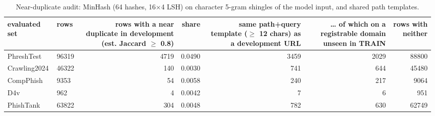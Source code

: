 \begin{table}[t]
\centering
\scriptsize
\caption{Near-duplicate audit: MinHash (64 hashes, 16×4 LSH) on character 5-gram shingles of the model input, and shared path templates.}
\label{tab:rev_R5_near_duplicates}
\begin{tabular}{llrrrrr}
\toprule
evaluated set & rows & rows with a near duplicate in development (est. Jaccard $\geq$ 0.8) & share & same path+query template ($\geq$ 12 chars) as a development URL & … of which on a registrable domain unseen in TRAIN & rows with neither \\
\midrule
PhreshTest & 96319 & 4719 & 0.0490 & 3459 & 2029 & 88800 \\
Crawling2024 & 46322 & 140 & 0.0030 & 741 & 644 & 45480 \\
CompPhish & 9353 & 54 & 0.0058 & 240 & 217 & 9064 \\
D4v & 962 & 4 & 0.0042 & 7 & 6 & 951 \\
PhishTank & 63822 & 304 & 0.0048 & 782 & 630 & 62749 \\
\bottomrule
\end{tabular}
\end{table}